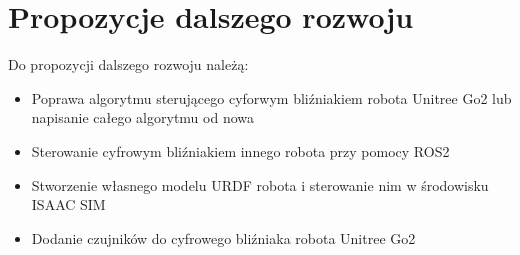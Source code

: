 \documentclass[12pt]{article}
\begin{document}
\section{Propozycje dalszego rozwoju}

Do propozycji dalszego rozwoju należą:
\begin{itemize}
    \item Poprawa algorytmu sterującego cyforwym bliźniakiem robota Unitree Go2 lub napisanie całego algorytmu od nowa
    \item Sterowanie cyfrowym bliźniakiem innego robota przy pomocy ROS2
    \item Stworzenie własnego modelu URDF robota i sterowanie nim w środowisku ISAAC SIM
    \item Dodanie czujników do cyfrowego bliźniaka robota Unitree Go2
\end{itemize}
\end{document}
